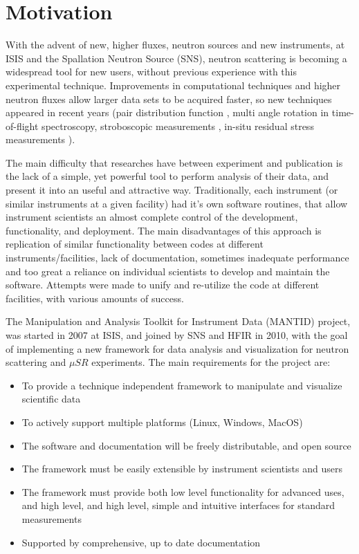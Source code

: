 \documentclass{elsarticle}
\begin{document}
\section{Motivation}
\label{motivation}
With the advent of new, higher fluxes, neutron sources and new instruments, at ISIS and the Spallation Neutron Source (SNS), 
neutron scattering is becoming a widespread tool for new users, without previous experience with this experimental technique. Improvements in computational techniques and higher neutron fluxes allow larger data sets to be acquired faster, so new techniques appeared in recent years (pair distribution function \cite{Egami}, multi angle rotation in time-of-flight spectroscopy, stroboscopic measurements \cite{Nojiri}, in-situ residual stress measurements \cite{Wang}). 

The main difficulty that researches have between experiment and publication
is the lack of a simple, yet powerful tool to perform analysis of their data,
and present it into an useful and attractive way.
Traditionally, each instrument (or similar instruments at a given facility) had it's own software routines, that allow instrument scientists an almost complete control of the development, functionality, and deployment. 
The main disadvantages of this approach is replication of similar functionality between codes at different instruments/facilities, lack of documentation, sometimes inadequate performance and too great a reliance on individual scientists to develop and maintain the software. Attempts were made to unify and re-utilize the code at different facilities, \cite{DAVE, OpenGenie, LAMP, ISAW} with various amounts of success. 


The Manipulation and Analysis Toolkit for Instrument Data (MANTID) project, was started in 2007 at ISIS, and joined by SNS and HFIR in 2010, with the goal of implementing a new framework for data analysis and visualization for neutron scattering and $\mu SR$ experiments. The main requirements for the project are:
\begin{itemize}
\item To provide a technique independent framework to manipulate and visualize scientific data 
\item To actively support multiple platforms (Linux, Windows, MacOS)
\item The software and documentation will be freely distributable, and open source
\item The framework must be easily extensible by instrument scientists and users
\item The framework must provide both low level functionality for advanced uses, and high level, and high level, simple and intuitive interfaces for standard measurements 
\item Supported by comprehensive, up to date documentation
\end{itemize}
 
\end{document}
